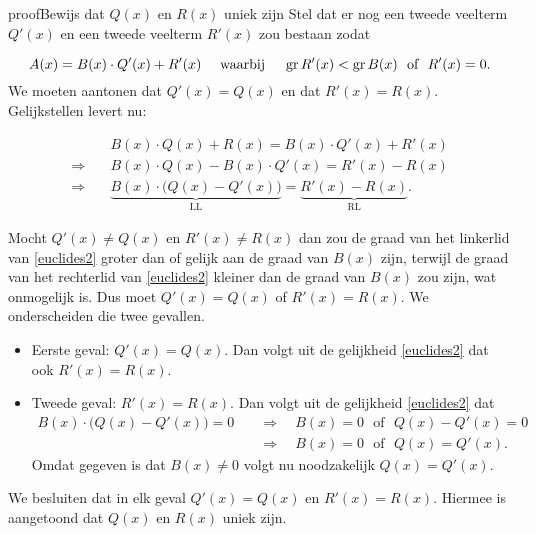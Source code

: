 \documentclass{ximera}
\begin{document}
\begin{expandable}{proof}{Bewijs dat \(Q(x)\) en \(R(x)\) uniek zijn} 
Stel dat er nog een tweede veelterm \(Q'(x)\) en een tweede veelterm \(R'(x)\) zou bestaan zodat

\[
A(x) = B(x)\cdot Q'(x) + R'(x) \quad \text{ waarbij } \quad \operatorname{gr} R'(x) < \operatorname{gr} B(x) \,\, \text{ of } \,\, R'(x) = 0.
\]
We moeten aantonen dat \(Q'(x) = Q(x)\) en dat \(R'(x) = R(x)\). Gelijkstellen levert nu:

\begin{align}
& B(x) \cdot Q(x) + R(x) = B(x) \cdot Q'(x) + R'(x) \\
\Rightarrow \quad & B(x) \cdot Q(x) - B(x) \cdot Q'(x) = R'(x) - R(x) \\ %
\Rightarrow \quad & \underbrace{B(x) \cdot \bigl(Q(x) - Q'(x)\bigr)}_{\text{LL}} = \underbrace{R'(x) - R(x)}_{\text{RL}}. %
\end{align}

Mocht \(Q'(x) \neq Q(x)\) en \(R'(x) \neq R(x)\) dan zou de graad van het linkerlid van \eqref{euclides2} groter dan of gelijk aan de graad van \(B(x)\) zijn, terwijl de graad van het rechterlid van \eqref{euclides2} kleiner dan de graad van \(B(x)\) zou zijn, wat onmogelijk is. Dus moet \(Q'(x) = Q(x)\) of \(R'(x) = R(x)\). We onderscheiden die twee gevallen.
\begin{itemize}
\item[]
Eerste geval: \(Q'(x) = Q(x)\). Dan volgt uit de gelijkheid \eqref{euclides2} dat ook \(R'(x) = R(x)\).  
\item[]
Tweede geval: \(R'(x) = R(x)\). Dan volgt uit de gelijkheid \eqref{euclides2} dat
\begin{align*}
B(x) \cdot \bigl(Q(x) - Q'(x)\bigr) = 0 \quad 
& \Rightarrow \quad B(x) = 0 \,\, \text{ of } \,\, Q(x) - Q'(x) = 0 \\
& \Rightarrow \quad B(x) = 0 \,\, \text{ of } \,\, Q(x) = Q'(x). 
\end{align*}
Omdat gegeven is dat \(B(x) \neq 0\) volgt nu noodzakelijk \(Q(x) = Q'(x)\).
\end{itemize}
We besluiten dat in elk geval \(Q'(x) = Q(x)\) en \(R'(x) = R(x)\). Hiermee is aangetoond dat \(Q(x)\) en \(R(x)\) uniek zijn. 

\end{expandable}
\end{document}

